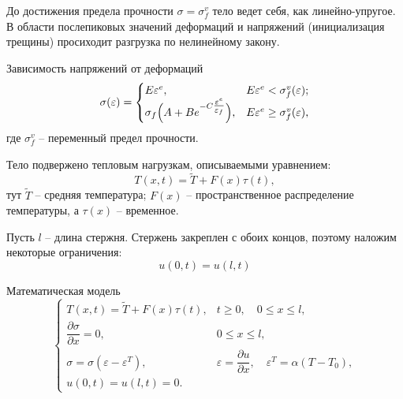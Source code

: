 \documentclass[unicode, 8pt]{beamer}
\begin{document}
    \begin{frame}
        До достижения предела прочности $\sigma = \sigma_f^v$ тело ведет себя, как линейно-упругое. В области послепиковых значений деформаций и напряжений (инициализация трещины) просиходит разгрузка по нелинейному закону. 

        \vspace{0.7em}

        \begin{block}{Зависимость напряжений от деформаций}
            \[
                \sigma(\varepsilon) = 
                    \begin{cases}
                    E\varepsilon^e, & E\varepsilon^e < \sigma_f^v(\varepsilon); \\
                    \sigma_f \Bigl( A + B e^{-C \tfrac{\varepsilon^e}{\varepsilon_f}} \Bigr), & E\varepsilon^e \geq \sigma_f^v(\varepsilon),
                    \end{cases}
                \label{sigma}
            \]
            \noindent где $\sigma_f^v$ -- переменный предел прочности. 
        \end{block}

        \vspace{0.7em}

        Тело подвержено тепловым нагрузкам, описываемыми уравнением:
        \[
          T(x,t) = \tilde{T} + F(x)\tau(t),  
        \]
        \noindent тут $\tilde{T}$ -- средняя температура; $F(x)$ -- пространственное распределение температуры, а $\tau(x)$ -- временное.
    \end{frame}

    \begin{frame}
        Пусть $l$ -- длина стержня. Стержень закреплен с обоих концов, поэтому наложим некоторые ограничения:
        \[
          u(0, t) = u(l, t)  
        \]

        \begin{block}{Математическая модель}
            \[
                \begin{cases}
                    T(x, t) = \widetilde{T} + F(x) \tau(t), & t \geq 0, \quad 0 \leq x \leq l, \\[0.7em]
                    \dfrac{\partial \sigma}{\partial x} = 0, & 0 \leq x \leq l, \\[0.7em]
                    \sigma = \sigma(\varepsilon - \varepsilon^T), & \varepsilon = \dfrac{\partial u}{\partial x}, \quad \varepsilon^T = \alpha(T - T_0), \\[0.7em]
                    u(0, t) = u(l, t) = 0.
                  \end{cases}  
            \]
        \end{block}
    \end{frame}
\end{document}
